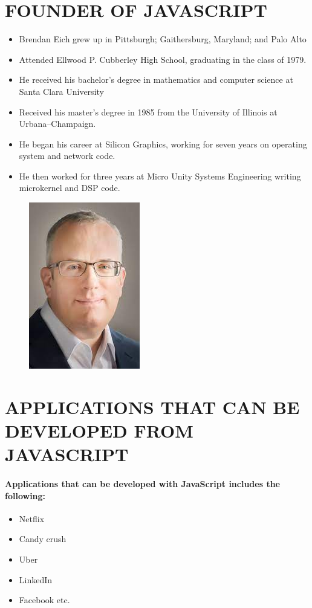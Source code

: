 \documentclass{article}
\begin{document}
	\section*{FOUNDER OF JAVASCRIPT}
		\begin{itemize}
		\item Brendan Eich grew up in Pittsburgh; Gaithersburg, Maryland; and Palo Alto
		\item Attended Ellwood P. Cubberley High School, graduating in the class of 1979.
		\item He received his bachelor's degree in mathematics and computer science at Santa Clara University
		\item Received his master's degree in 1985 from the University of Illinois at Urbana–Champaign.
		\item He began his career at Silicon Graphics, working for seven years on operating system and network code.
		\item He then worked for three years at Micro Unity Systems Engineering writing microkernel and DSP code.
	\end{itemize}
\begin{figure}
		\begin{center}
	\includegraphics[width=0.3\linewidth]{brendan.jpg}
\end{center}
\end{figure}
		\newpage
	\section*{APPLICATIONS THAT CAN BE DEVELOPED FROM JAVASCRIPT}
	\paragraph{Applications that can be developed with JavaScript includes the following:
	}
\begin{itemize}
	\item Netflix
	\item Candy crush
	\item Uber
	\item LinkedIn
	\item Facebook etc.
\end{itemize}
\newpage
\end{document}
